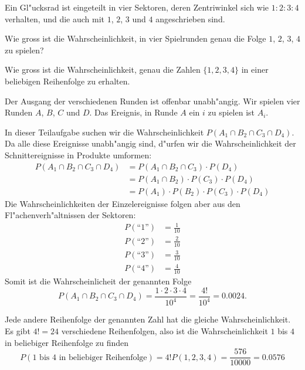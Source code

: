 Ein Gl"ucksrad ist eingeteilt in vier Sektoren, deren Zentriwinkel
sich wie $1:2:3:4$ verhalten, und die auch mit $1$, $2$, $3$ und $4$
angeschrieben sind.
\begin{teilaufgaben}
\item Wie gross ist die Wahrscheinlichkeit, in vier Spielrunden genau die
Folge $1$, $2$, $3$, $4$ zu spielen?
\item Wie gross ist die Wahrscheinlichkeit, genau die Zahlen $\{1,2,3,4\}$
in einer beliebigen Reihenfolge zu erhalten.
\end{teilaufgaben}

\begin{loesung}
Der Ausgang der verschiedenen Runden ist offenbar unabh"angig.
Wir spielen vier Runden $A$, $B$, $C$ und $D$. Das Ereignis, in
Runde $A$ ein $i$ zu spielen ist $A_i$.

\begin{teilaufgaben}
\item
In dieser Teilaufgabe suchen wir die Wahrscheinlichkeit
$P(A_1\cap B_2\cap C_3\cap D_4)$. Da alle diese Ereignisse
unabh"angig sind, d"urfen wir die Wahrscheinlichkeit der
Schnittereignisse in Produkte umformen:
\begin{align*}
P(A_1\cap B_2\cap C_3\cap D_4)
&=
P(A_1\cap B_2\cap C_3)\cdot P(D_4)
\\
&=
P(A_1\cap B_2)\cdot P(C_3)\cdot P(D_4)
\\
&=
P(A_1)\cdot P(B_2)\cdot P(C_3)\cdot P(D_4)
\end{align*}
Die Wahrscheinlichkeiten der Einzelereignisse folgen aber aus den
Fl"achenverh"altnissen der Sektoren:
\begin{align*}
P(\text{``1''})&=\frac1{10}\\
P(\text{``2''})&=\frac2{10}\\
P(\text{``3''})&=\frac3{10}\\
P(\text{``4''})&=\frac4{10}
\end{align*}
Somit ist die Wahrscheinlicheit der genannten Folge
\[
P(A_1\cap B_2\cap C_3\cap D_4)
=\frac{1\cdot2\cdot 3\cdot 4}{10^4}=\frac{4!}{10^4}=0.0024.
\]
\item Jede andere Reihenfolge der genannten Zahl hat die gleiche
Wahrscheinlichkeit. Es gibt $4!=24$ verschiedene Reihenfolgen, also
ist die Wahrscheinlichkeit $1$ bis $4$ in beliebiger Reihenfolge
zu finden
\[
P(\text{$1$ bis $4$ in beliebiger Reihenfolge})=4!P(1,2,3,4)=
\frac{576}{10000}=0.0576
\]
\end{teilaufgaben}
\end{loesung}

